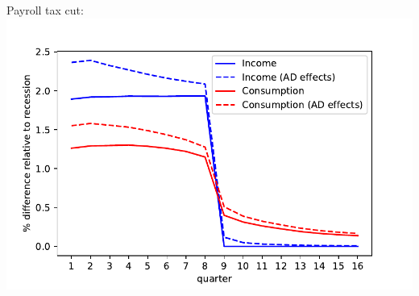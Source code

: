 \documentclass[pdflatex,aspectratio=169]{beamer}
\begin{document}
{\begin{frame}
\begin{columns}
			\begin{column}{0.50\textwidth}  
				Payroll tax cut:	
				\includegraphics[width=1.2\linewidth]{Code/HA-Models/FromPandemicCode/Figures/recession_taxcut_relrecession}
			\end{column}
		\end{columns}
		
	\end{frame}
	


}{}
\end{document}
